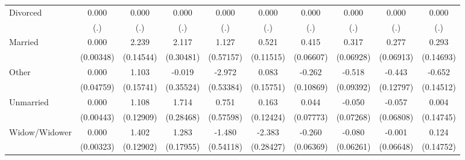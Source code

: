 {\begin{tabular}{l*{9}{c}}
Divorced            &       0.000         &       0.000         &       0.000         &       0.000         &       0.000         &       0.000         &       0.000         &       0.000         &       0.000         \\
                    &         (.)         &         (.)         &         (.)         &         (.)         &         (.)         &         (.)         &         (.)         &         (.)         &         (.)         \\
Married             &       0.000         &       2.239\sym{***}&       2.117\sym{***}&       1.127\sym{*}  &       0.521\sym{***}&       0.415\sym{***}&       0.317\sym{***}&       0.277\sym{***}&       0.293\sym{*}  \\
                    &   (0.00348)         &   (0.14544)         &   (0.30481)         &   (0.57157)         &   (0.11515)         &   (0.06607)         &   (0.06928)         &   (0.06913)         &   (0.14693)         \\
Other               &       0.000         &       1.103\sym{***}&      -0.019         &      -2.972\sym{***}&       0.083         &      -0.262\sym{*}  &      -0.518\sym{***}&      -0.443\sym{***}&      -0.652\sym{***}\\
                    &   (0.04759)         &   (0.15741)         &   (0.35524)         &   (0.53384)         &   (0.15751)         &   (0.10869)         &   (0.09392)         &   (0.12797)         &   (0.14512)         \\
Unmarried           &       0.000         &       1.108\sym{***}&       1.714\sym{***}&       0.751         &       0.163         &       0.044         &      -0.050         &      -0.057         &       0.004         \\
                    &   (0.00443)         &   (0.12909)         &   (0.28468)         &   (0.57598)         &   (0.12424)         &   (0.07773)         &   (0.07268)         &   (0.06808)         &   (0.14745)         \\
Widow/Widower       &       0.000         &       1.402\sym{***}&       1.283\sym{***}&      -1.480\sym{**} &      -2.383\sym{***}&      -0.260\sym{***}&      -0.080         &      -0.001         &       0.124         \\
                    &   (0.00323)         &   (0.12902)         &   (0.17955)         &   (0.54118)         &   (0.28427)         &   (0.06369)         &   (0.06261)         &   (0.06648)         &   (0.14752)         \\

\end{tabular}}

